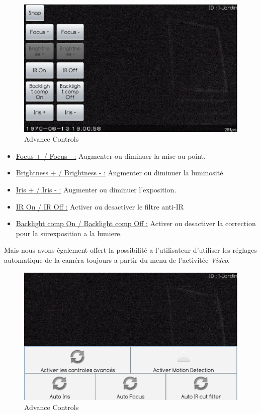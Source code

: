 \begin{figure}[H]
  \label{ctrl2}
  \centering
   \includegraphics[scale=0.4]{Images/ctrl2.eps}
  \caption{Advance Controls}
\end{figure}  
\begin{itemize}
  \item \underline{Focus + / Focus - :} Augmenter ou diminuer la mise au
  point.
  \item \underline{Brightness + / Brightness - :} Augmenter ou diminuer la luminosité
  \item \underline{Iris + / Iris - :} Augmenter ou diminuer l'exposition.
  \item \underline{IR On / IR Off :} Activer ou desactiver le filtre
  anti-IR
  \item \underline{Backlight comp On / Backlight comp Off :} Activer ou
  desactiver la correction pour la surexposition a la lumiere.
\end{itemize}
Mais nous avons également offert la possibilité a l'utilisateur d'utiliser les
réglages automatique de la caméra toujours a partir du menu de l'activitée
\textit{Video}.
\begin{figure}[H]
  \label{ctrl2}
  \centering
   \includegraphics[scale=0.4]{Images/ctrl1.eps}
  \caption{Advance Controls}
\end{figure}  



